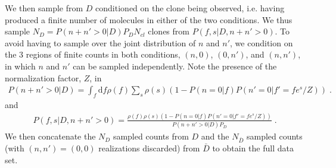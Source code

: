 \documentclass[letterpaper,english,prl,reprint,longbibliography]{revtex4-1} %
\begin{document}
We then sample from $D$ conditioned on the clone being observed, i.e. having produced a finite number of molecules in either of the two conditions. We thus sample $N_D=P(n+n'>0|D)P_D N_{cl}$ clones from $P(f,s|D,n+n'>0)$. To avoid having to sample over the joint distribution of $n$ and $n'$, we condition on the 3 regions of finite counts in both conditions, $(n,0)$, $(0,n')$, and $(n,n')$, in which $n$ and $n'$ can be sampled independently. 
Note the presence of the normalization factor, $Z$, in 
\begin{align}
	P(n+n'>0|D)=\int_f \textrm{d}f\rho(f)\sum_s \rho(s)(1-P(n=0|f)P(n'=0|f'=fe^s/Z))\;.
\end{align}
and
\begin{align}
	P(f,s|D,n+n'>0)=\frac{\rho(f)\rho(s)(1-P(n=0|f)P(n'=0|f'=fe^s/Z))}{P(n+n'>0|D)P_D}\;.
\end{align}
We then concatenate the $N_D$ sampled counts from $D$ and the $N_{\bar D}$ sampled counts (with $(n,n')=(0,0)$ realizations discarded) from $\bar D$ to obtain the full data set.  
\end{document}
